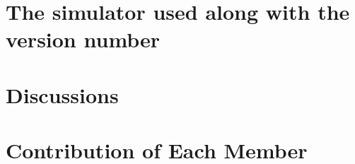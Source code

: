 \documentclass[11pt]{article}
\begin{document}
\section{The simulator used along with the version number}

\section{Discussions}

\section{Contribution of Each Member}
\end{document}
